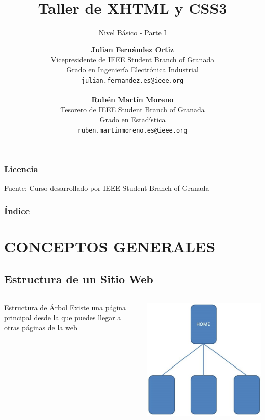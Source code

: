 \documentclass{beamer}
\title[XHTML y CSS]{Taller de XHTML y CSS3}
\subtitle{Nivel Básico - Parte I}
\author[Julián Fernández, Rubén Martín]{
	\textbf{Julian Fernández Ortiz }
	\\
	\medskip
	\scriptsize{
	Vicepresidente de IEEE Student Branch of Granada\\
	Grado en Ingeniería Electrónica Industrial
	}	
	\\	
	\texttt{julian.fernandez.es@ieee.org}
	\\ \ \\
	\small{\textbf{Rubén Martín Moreno}}
	\\
	\medskip
	\scriptsize{
	Tesorero de IEEE Student Branch of Granada\\
	Grado en Estadística
	}
	\\
	\texttt{ruben.martinmoreno.es@ieee.org}
}
\date{}
\begin{document}
\frame{\titlepage}

\begin{frame}
\frametitle{Licencia}
\doclicenseThis
Fuente: Curso desarrollado por IEEE Student Branch of Granada
\end{frame}

\begin{frame}
  \frametitle{Índice}
  \tableofcontents
\end{frame}

\section{CONCEPTOS GENERALES}
	\subsection{Estructura de un Sitio Web}
\begin{frame}
  \begin{columns}[c]
	\begin{block}{Estructura de Árbol}
	Existe una página principal desde la que puedes llegar a otras páginas de la web
	\end{block}

	\begin{center}
	\includegraphics[scale=.3]{images/EstructuraArbol.JPG} 
	\end{center}
  \end{columns}
\end{frame}
\end{document}
